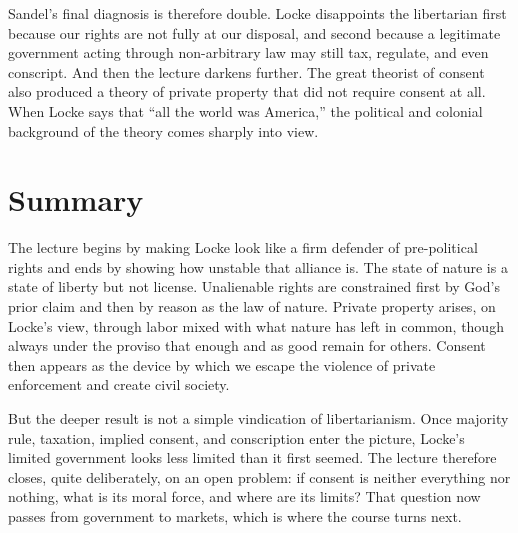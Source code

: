 Sandel's final diagnosis is therefore double. Locke disappoints the libertarian first because our rights are not fully at our disposal, and second because a legitimate government acting through non-arbitrary law may still tax, regulate, and even conscript. And then the lecture darkens further. The great theorist of consent also produced a theory of private property that did not require consent at all. When Locke says that ``all the world was America,'' the political and colonial background of the theory comes sharply into view.

\section{Summary}

The lecture begins by making Locke look like a firm defender of pre-political rights and ends by showing how unstable that alliance is. The state of nature is a state of liberty but not license. Unalienable rights are constrained first by God's prior claim and then by reason as the law of nature. Private property arises, on Locke's view, through labor mixed with what nature has left in common, though always under the proviso that enough and as good remain for others. Consent then appears as the device by which we escape the violence of private enforcement and create civil society.

But the deeper result is not a simple vindication of libertarianism. Once majority rule, taxation, implied consent, and conscription enter the picture, Locke's limited government looks less limited than it first seemed. The lecture therefore closes, quite deliberately, on an open problem: if consent is neither everything nor nothing, what is its moral force, and where are its limits? That question now passes from government to markets, which is where the course turns next.